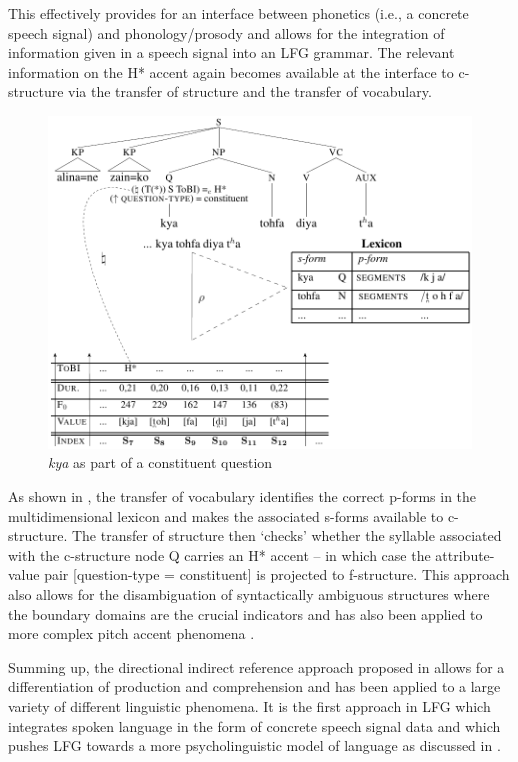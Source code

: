 \documentclass[output=paper,hidelinks]{langscibook}
\begin{document}
This effectively provides for an interface between phonetics (i.e., a concrete speech signal) and phonology/prosody and allows for the integration of information given in a speech signal into an LFG grammar.
The relevant information on the H* accent again becomes available at the interface to c-structure via the transfer of structure and the transfer of vocabulary. 

\begin{figure}
\centering 
\includegraphics[width=.8\textwidth]{figures/Prosody/Boegel_Figure_24.pdf}
\caption{{\em kya} as part of a constituent question \citep{Buttetal2020}}
\label{fig:kya-question}
\end{figure}

As shown in , the transfer of vocabulary identifies the correct p-forms in the multidimensional lexicon and makes the associated s-forms available to c-structure. The transfer of structure then `checks' whether the syllable associated with the c-structure node Q carries an H* accent -- in which case the attribute-value pair [{\sc question-type} = constituent] is projected to f-structure. 
This approach also allows for the disambiguation of syntactically ambiguous structures where the boundary domains are the crucial indicators \citep{Boegel2020} and has also been applied to more complex pitch accent phenomena \citep{BoegelRaach2020}.

Summing up, the directional indirect reference approach proposed in \citet{Boegel2015} allows for a differentiation of production and comprehension and has been applied to a large variety of different linguistic phenomena. It is the first approach in LFG which integrates spoken language in the form of concrete speech signal data and which pushes LFG towards a more psycholinguistic model of language as discussed in .
\end{document}
